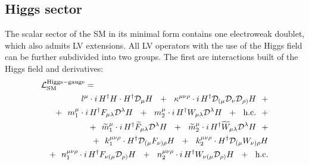 \documentclass[12pt,preprintnumbers,nofootinbib]{revtex4}
\newcommand{\wt}{\widetilde}
\newcommand{\md}{\mathcal{D}}
\begin{document}
\subsection{Higgs sector}	
	The scalar sector of the SM in its minimal form contains one electroweak doublet,
which also admits LV extensions. All LV operators with the use of the Higgs field can 
be further subdivided into two groups. 
	The first are interactions built of the Higgs field and 
	derivatives:
\begin{eqnarray*}
\nonumber
\lefteqn{
	\mathcal{L}_{\rm SM}^{\rm Higgs-gauge} =
	}
	\\
\nonumber
	&&
	\phantom{+~~}
	l^\mu \cdot
	i\, 
	H^\dag H \cdot H^\dag \md_\mu H
	~~+~~
	\kappa^{\mu\nu\rho} \cdot
	i\, 
	H^\dag \md_{(\mu} \md_\nu \md_{\rho)} H
	~~+
	\\
\nonumber
	&&
	+~~
	m^\mu_1 \cdot
	i\, 
	H^\dag F_{\mu\lambda} \md^\lambda H
	~~+~~
	m^\mu_2 \cdot
	i\, 
	H^\dag W_{\mu\lambda} \md^\lambda H
	~~+~~
	\text{h.c.}
	~~+
	\\
\nonumber
	&&
	+~~
	\wt{m}^\mu_1 \cdot
	i\, 
	H^\dag \wt{F}_{\mu\lambda} \md^\lambda H
	~~+~~
	\wt{m}^\mu_2 \cdot
	i\, 
	H^\dag \wt{W}_{\mu\lambda} \md^\lambda H
	~~+
	\\
\nonumber
	&&
	+~~
	k^{\mu\nu\rho}_{1} \cdot
	H^\dag \md_{(\mu} F_{\nu)\rho} H
	~~+~~
	k^{\mu\nu\rho}_{2} \cdot
	H^\dag \md_{(\mu} W_{\nu)\rho} H
	\\
\nonumber
	&&
	+~~
	n^{\mu\nu\rho}_{1} \cdot
	i\, 
	H^\dag F_{\nu(\mu} \md_{\rho)} H
	~~+~~
	n^{\mu\nu\rho}_{2} \cdot
	i\, 
	H^\dag W_{\nu(\mu} \md_{\rho)}  H
	~~+~~
	\text{h.c.}
\end{eqnarray*}
\end{document}
